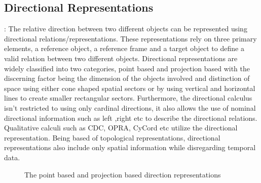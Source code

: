 		\subsection{Directional Representations} \cite{chen2015survey} : The relative direction between two different objects can be represented using directional relations/representations. These representations rely on three primary elements, a reference object, a reference frame and a target object to define a valid relation between two different objects. Directional representations are widely classified into two categories, point based and projection based with the discerning factor being the dimension of the objects involved and distinction of space using either cone shaped spatial sectors or by using vertical and horizontal lines to create smaller rectangular sectors. Furthermore, the directional calculus isn't restricted to using only cardinal directions, it also allows the use of nominal directional information such as left ,right etc to describe the directional relations. Qualitative calculi such as CDC, OPRA, CyCord etc utilize the directional representation. Being based of topological representations, directional representations also include only spatial information while disregarding temporal data.
		
		\begin{figure}[h!]%
			\centering
			\qquad
			\caption{The point based and projection based direction representations \cite{chen2015survey}}%
			\label{fig:example}%
		\end{figure}
	
